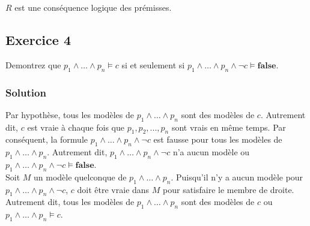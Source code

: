     $R$ est une conséquence logique des prémisses.\\
        


\subsection*{Exercice 4}
Demontrez que $p_1 \wedge \ldots \wedge p_n \models c$ si et seulement si $p_1 \wedge \ldots \wedge p_n \wedge \neg c \models \textbf{false}$.

    \subsubsection*{Solution}

\noindent \fbox{$\implies$} Par hypothèse, tous les modèles de $p_1 \wedge \ldots \wedge p_n$ sont des modèles de $c$. Autrement dit, $c$ est vraie à chaque fois que  $p_1,p_2,...,p_n$ sont vrais en même temps. Par conséquent, la formule $p_1 \wedge \ldots \wedge p_n \wedge \neg c$ est fausse pour tous les modèles de $p_1 \wedge \ldots \wedge p_n$. Autrement dit, $p_1 \wedge \ldots \wedge p_n \wedge \neg c$ n'a aucun modèle ou $p_1 \wedge \ldots \wedge p_n \wedge \neg c \models \textbf{false}$. \\

\noindent \fbox{$\impliedby$} Soit $M$ un modèle quelconque de  $p_1 \wedge \ldots \wedge p_n$. Puisqu'il n'y a aucun modèle pour  $p_1 \wedge \ldots \wedge p_n \wedge \neg c$, $c$ doit être vraie dans $M$ pour satisfaire le membre de droite. Autrement dit, tous les modèles de $p_1 \wedge \ldots \wedge p_n$ sont des modèles de $c$ ou $p_1 \wedge \ldots \wedge p_n \models c$.